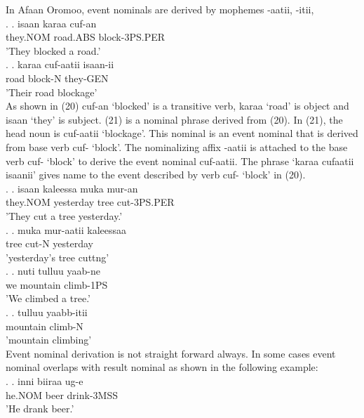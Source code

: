 \documentclass[11pt,a4paper]{article}
\begin{document}
In Afaan Oromoo, event nominals are derived by mophemes  -aatii, -itii, \\

\ex.
\ag.
isaan karaa cuf-an \\
they.NOM road.ABS block-3PS.PER\\
'They blocked a road.'\\

\ex.
\ag.
karaa cuf-aatii isaan-ii \\
road block-N they-GEN\\
'Their road blockage'\\


As shown in (20) cuf-an ‘blocked’ is a transitive verb, karaa ‘road’ is object and isaan ‘they’ is subject. (21) is a nominal phrase derived from (20). In (21), the head noun is cuf-aatii ‘blockage’. This nominal is an event nominal that is derived from base verb cuf- ‘block’. The nominalizing affix -aatii is attached to the base verb cuf- ‘block’ to derive the event nominal cuf-aatii. The phrase ‘karaa cufaatii isaanii’ gives name to the event described by verb cuf- ‘block’ in (20). \\

\ex.
\ag.
isaan kaleessa muka mur-an \\
they.NOM yesterday tree cut-3PS.PER\\
'They cut a tree yesterday.'\\

\ex.
\ag.
muka mur-aatii kaleessaa \\
tree cut-N yesterday\\
'yesterday's tree cuttng'\\

\ex.
\ag.
nuti tulluu yaab-ne \\
we mountain climb-1PS\\
'We climbed a tree.'\\

\ex.
\ag.
tulluu yaabb-itii \\
mountain climb-N\\
'mountain climbing'\\


Event nominal derivation is not straight forward always. In some cases event nominal overlaps with result nominal as shown in the following example:\\

\ex.
\ag.
inni biiraa ug-e \\
he.NOM beer drink-3MSS\\
'He drank beer.'\\
\end{document}
